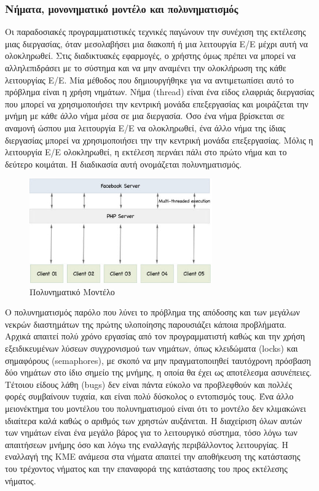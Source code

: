 \subsubsection{Νήματα, μονονηματικό μοντέλο και πολυνηματισμός}


		Οι παραδοσιακές προγραμματιστικές τεχνικές παγώνουν την συνέχιση της εκτέλεσης μιας διεργασίας, όταν μεσολαβήσει μια διακοπή ή μια λειτουργία E/E μέχρι αυτή να ολοκληρωθεί. Στις διαδικτυακές εφαρμογές, ο χρήστης όμως πρέπει να μπορεί να αλληλεπιδράσει με το σύστημα και να μην αναμένει την ολοκλήρωση της κάθε λειτουργίας Ε/Ε. Μία μέθοδος που δημιουργήθηκε για να αντιμετωπίσει αυτό το πρόβλημα είναι η χρήση νημάτων. Νήμα (thread) είναι ένα είδος ελαφριάς διεργασίας που μπορεί να χρησιμοποιήσει την κεντρική μονάδα επεξεργασίας και μοιράζεται την μνήμη με κάθε άλλο νήμα μέσα σε μια διεργασία. Όσο ένα νήμα βρίσκεται σε αναμονή ώσπου μια λειτουργία Ε/Ε να ολοκληρωθεί, ένα άλλο νήμα της ίδιας διεργασίας μπορεί να χρησιμοποιήσει την την κεντρική μονάδα επεξεργασίας. Μόλις η λειτουργία Ε/Ε ολοκληρωθεί, η εκτέλεση περνάει πάλι στο πρώτο νήμα και το δεύτερο κοιμάται. Η διαδικασία αυτή ονομάζεται πολυνηματισμός.
		
		
				 \begin{figure}[h]
	    \centering
	    \includegraphics[width=0.7\textwidth]{multi-threaded.jpg}
	    \caption{Πολυνηματικό Μοντέλο}
	    \label{fig:multi}
	\end{figure}
	
	
	
		 Ο πολυνηματισμός παρόλο που λύνει το πρόβλημα της απόδοσης και των μεγάλων νεκρών διαστημάτων της πρώτης υλοποίησης παρουσιάζει κάποια προβλήματα. Αρχικά απαιτεί πολύ χρόνο εργασίας από τον προγραμματιστή καθώς και την χρήση εξειδικευμένων λύσεων συγχρονισμού των νημάτων, όπως κλειδώματα (locks) και σημαφόρους (semaphores), με σκοπό να μην πραγματοποιηθεί ταυτόχρονη πρόσβαση δύο νημάτων στο ίδιο σημείο της μνήμης, η οποία θα έχει ως αποτέλεσμα ασυνέπειες.  \cite{silberschatz} Τέτοιου είδους λάθη (bugs) δεν είναι πάντα εύκολο να προβλεφθούν και πολλές φορές συμβαίνουν τυχαία, και είναι πολύ δύσκολος ο εντοπισμός τους. Ένα άλλο μειονέκτημα του μοντέλου του πολυνηματισμού είναι ότι το μοντέλο  δεν κλιμακώνει ιδιαίτερα καλά καθώς ο αριθμός των χρηστών αυξάνεται. Η διαχείριση όλων αυτών των νημάτων είναι ένα μεγάλο βάρος για το λειτουργικό σύστημα, τόσο λόγω των απαιτήσεων μνήμης όσο και λόγω της εναλλαγής περιβάλλοντος λειτουργίας. Η εναλλαγή της ΚΜΕ ανάμεσα στα νήματα απαιτεί την αποθήκευση της κατάστασης του τρέχοντος νήματος και την επαναφορά της κατάστασης του προς εκτέλεσης νήματος. 
		
